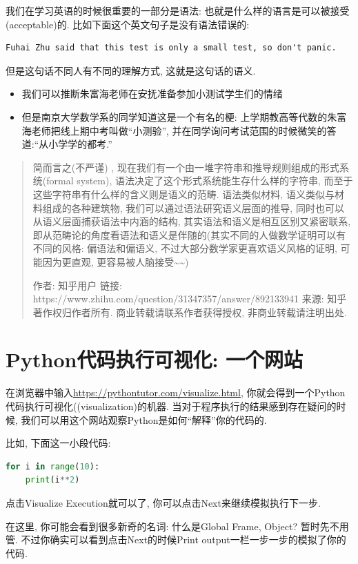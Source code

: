 我们在学习英语的时候很重要的一部分是语法: 也就是什么样的语言是可以被接受(acceptable)的. 比如下面这个英文句子是没有语法错误的: 
\begin{verbatim}
Fuhai Zhu said that this test is only a small test, so don't panic.
\end{verbatim}
但是这句话不同人有不同的理解方式, 这就是这句话的语义. 
\begin{itemize}
\item 我们可以推断朱富海老师在安抚准备参加小测试学生们的情绪
\item 但是南京大学数学系的同学知道这是一个有名的梗: 上学期教高等代数的朱富海老师把线上期中考叫做``小测验'', 并在同学询问考试范围的时候微笑的答道:``从小学学的都考.''
\end{itemize}
\begin{quote}
简而言之(不严谨) , 现在我们有一个由一堆字符串和推导规则组成的形式系统(formal system), 语法决定了这个形式系统能生存什么样的字符串, 而至于这些字符串有什么样的含义则是语义的范畴.
语法类似材料, 语义类似与材料组成的各种建筑物, 我们可以通过语法研究语义层面的推导, 同时也可以从语义层面捕获语法中内涵的结构,
其实语法和语义是相互区别又紧密联系, 即从范畴论的角度看语法和语义是伴随的(其实不同的人做数学证明可以有不同的风格: 偏语法和偏语义,
不过大部分数学家更喜欢语义风格的证明, 可能因为更直观, 更容易被人脑接受\textasciitilde\textasciitilde ) 

作者: 知乎用户 链接: https://www.zhihu.com/question/31347357/answer/892133941
来源: 知乎 著作权归作者所有. 商业转载请联系作者获得授权, 非商业转载请注明出处. 
\end{quote}

\section{Python代码执行可视化: 一个网站}

\begin{tool}
在浏览器中输入\url{https://pythontutor.com/visualize.html}, 你就会得到一个Python代码执行可视化((visualization)的机器. 当对于程序执行的结果感到存在疑问的时候, 我们可以用这个网站观察Python是如何``解释''你的代码的.

比如, 下面这一小段代码: 
\begin{lstlisting}[language=python]
for i in range(10):
    print(i**2)
\end{lstlisting}

点击Visualize Execution就可以了, 你可以点击Next来继续模拟执行下一步.

在这里, 你可能会看到很多新奇的名词: 什么是Global Frame, Object? 暂时先不用管. 不过你确实可以看到点击Next的时候Print output一栏一步一步的模拟了你的代码. 
\end{tool}

